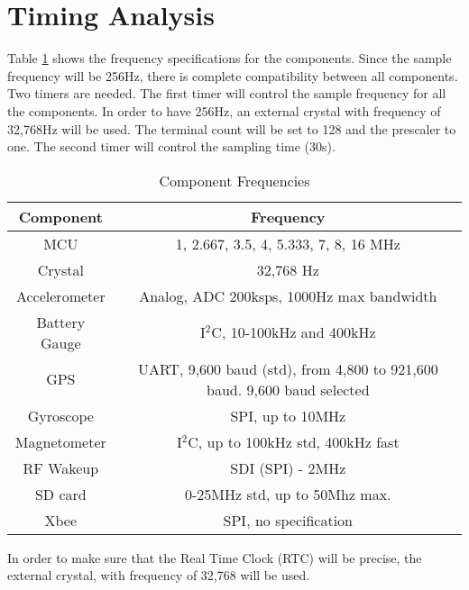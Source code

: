 \section{Timing Analysis}

Table \ref{tab:compFreq} shows the frequency specifications for the components.  Since the sample frequency will be 256Hz, there is complete compatibility between all components.  Two timers are needed.  The first timer will control the sample frequency for all the components.  In order to have 256Hz, an external crystal with frequency of 32,768Hz will be used.  The terminal count will be set to 128 and the prescaler to one.  The second timer will control the sampling time (30s).

\begin{table}[H]
  \centering
  \caption{Component Frequencies}
    \begin{tabular}{|c|c|}
    \hline
    Component & Frequency \\
    \hline \hline
    MCU   & 1, 2.667, 3.5, 4, 5.333, 7, 8, 16 MHz \\ \hline
    Crystal & 32,768 Hz \\ \hline
    Accelerometer & Analog, ADC 200ksps, 1000Hz max bandwidth \\ \hline
    Battery Gauge & I$^2$C, 10-100kHz and 400kHz \\ \hline
    GPS   & UART, 9,600 baud (std), from 4,800 to 921,600 baud. 9,600 baud selected\\ \hline
    Gyroscope & SPI, up to 10MHz \\ \hline
    Magnetometer & I$^2$C, up to 100kHz std, 400kHz fast \\ \hline
    RF Wakeup & SDI (SPI) - 2MHz \\ \hline
    SD card & 0-25MHz std, up to 50Mhz max. \\ \hline
    Xbee  & SPI, no specification \\ \hline
    \end{tabular}
  \label{tab:compFreq}
\end{table}

In order to make sure that the Real Time Clock (RTC) will be precise, the external crystal, with frequency of 32,768 will be used.




